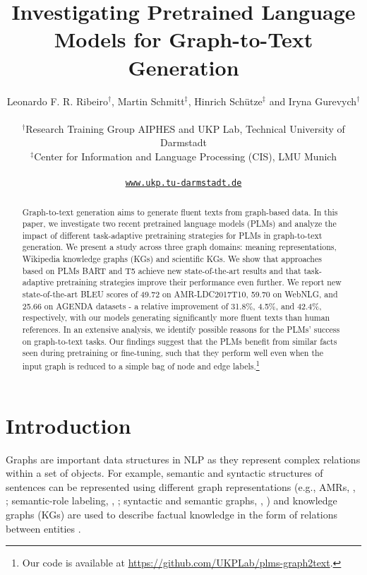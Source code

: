 \documentclass[11pt]{article}
\title{Investigating Pretrained Language Models for Graph-to-Text Generation}
\author{Leonardo F. R. Ribeiro$^{\dag}$, Martin Schmitt$^{\ddag}$, Hinrich Sch{\"u}tze$^{\ddag}$ and Iryna Gurevych$^{\dag}$ \vspace{1mm} \\
\rule{0pt}{2.5ex}
  $^{\dag}$Research Training Group AIPHES and UKP Lab, Technical University of Darmstadt\\
  $^{\ddag}$Center for Information and Language Processing (CIS), LMU Munich \\
  \rule{0pt}{2.5ex}
 \texttt{\href{https://www.ukp.tu-darmstadt.de}{www.ukp.tu-darmstadt.de}}
}
\begin{document}
\maketitle
\begin{abstract}
Graph-to-text generation aims to generate fluent texts from graph-based data. In this paper, we investigate two recent pretrained language models (PLMs) and analyze the impact of different task-adaptive pretraining strategies for PLMs in graph-to-text generation. We present a study across three graph domains: meaning representations, Wikipedia knowledge graphs (KGs) and scientific KGs. We show that approaches based on PLMs BART and T5 achieve new state-of-the-art results and that task-adaptive pretraining strategies improve their performance even further. We report new state-of-the-art BLEU scores of 49.72 on AMR-LDC2017T10, 59.70 on WebNLG, and 25.66 on AGENDA datasets - a relative improvement of 31.8\%, 4.5\%, and 42.4\%, respectively, with our models generating significantly more fluent texts than human references.  In an extensive analysis, we identify possible reasons for the PLMs’ success on graph-to-text tasks. Our findings suggest that the PLMs benefit from similar facts seen during pretraining or fine-tuning, such that they perform well even when the input graph is reduced to a simple bag of node and edge labels.\footnote{Our code is available at \href{https://github.com/UKPLab/plms-graph2text}{https://github.com/UKPLab/plms-graph2text}.}
\end{abstract}



\section{Introduction}

Graphs are important data structures in NLP as they represent complex relations within a set of objects. For example, semantic and syntactic structures of sentences can be represented using different graph representations (e.g., AMRs, \citeauthor{banarescu-etal-2013-abstract}, \citeyear{banarescu-etal-2013-abstract}; semantic-role labeling, \citeauthor{surdeanu-etal-2008-conll}, \citeyear{surdeanu-etal-2008-conll}; syntactic and semantic graphs, \citeauthor{belz-etal-2011-first}, \citeyear{belz-etal-2011-first}) and knowledge graphs (KGs) are used to describe factual knowledge in the form of relations between entities \cite{gardent-etal-2017-webnlg, VOUGIOUKLIS20181, koncel-kedziorski-etal-2019-text}.
\end{document}
